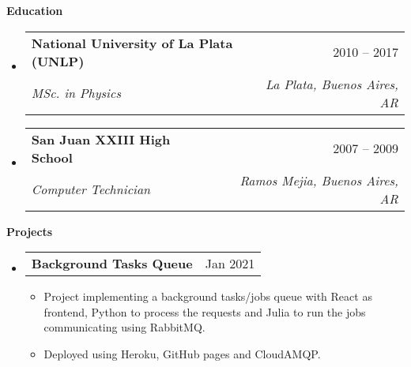 \documentclass[letterpaper,12pt]{article}[leftmargin=*]
\makeatletter
\def \entryspacing {-0pt}
\renewcommand{\section}[2]{\vspace{5pt}
  \colorbox{secondary}{\color{white}\raggedbottom\normalsize\textbf{{#1}{\hspace{7pt}#2}}}
}
\newcommand{\resumeEntryStart}{\begin{itemize}[leftmargin=2.5mm]}
\newcommand{\resumeEntryEnd}{\end{itemize}\vspace{\entryspacing}}
\newcommand{\resumeItemListStart}{\begin{itemize}[leftmargin=4.5mm]}
\newcommand{\resumeItemListEnd}{\end{itemize}}
\newcommand{\resumeItem}[1]{
  \item\small{
    {#1 \vspace{-2pt}}
  }
}
\newcommand{\resumeEntryTSDL}[4]{
  \vspace{-1pt}\item[]
    \begin{tabularx}{0.97\textwidth}{X@{\hspace{60pt}}r}
      \textbf{\color{primary}#1} & {\firabook\color{accent}\small#2} \\
      \textit{\color{accent}\small#3} & \textit{\color{accent}\small#4} \\
    \end{tabularx}\vspace{-6pt}
}
\newcommand{\resumeEntryTD}[2]{
  \vspace{-1pt}\item[]
    \begin{tabularx}{0.97\textwidth}{X@{\hspace{60pt}}r}
      \textbf{\color{primary}#1} & {\firabook\color{accent}\small#2} \\
    \end{tabularx}\vspace{-6pt}
}
\makeatother
\begin{document}
  \newpage
\section{\faGraduationCap}{Education}

  \resumeEntryStart
    \resumeEntryTSDL
      {National University of La Plata (UNLP) \href{https://unlp.edu.ar/}{\faGlobe}}{2010 -- 2017}
      {MSc. in Physics}{La Plata, Buenos Aires, AR}
  \resumeEntryEnd

    \resumeEntryStart
    \resumeEntryTSDL
      {San Juan XXIII High School \href{http://parroquialjuan23.edu.ar/}{\faGlobe}}{2007 -- 2009}
      {Computer Technician}{Ramos Mejia, Buenos Aires, AR}
  \resumeEntryEnd

\section{\faFlask}{Projects}\href{https://mattborghi.github.io/projects/}{\faGlobe}

  \resumeEntryStart
  \resumeEntryTD
      {Background Tasks Queue \href{https://mattborghi.github.io/projects/Background\%20Task\%20Queues/}{\faGithub}}{Jan 2021}
    \resumeItemListStart
      \resumeItem {Project implementing a background tasks/jobs queue with React as frontend, Python to process the requests and Julia to run the jobs communicating using RabbitMQ.}
      \resumeItem{Deployed using Heroku, GitHub pages and CloudAMQP.}
  \resumeItemListEnd
  \resumeEntryEnd

\end{document}
